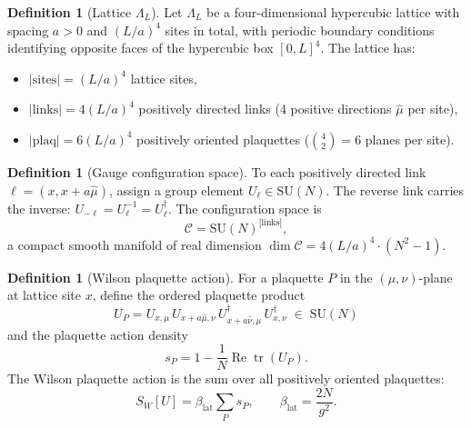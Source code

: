 \documentclass[12pt,a4paper]{article}
\theoremstyle{plain}
\theoremstyle{definition}
\newtheorem{definition}[theorem]{Definition}
\theoremstyle{remark}
\begin{document}
\begin{definition}[Lattice $\Lambda_L$]\label{def:lattice}
Let $\Lambda_L$ be a four-dimensional hypercubic lattice with spacing $a>0$ and $(L/a)^4$ sites in total, with periodic boundary conditions identifying opposite faces of the hypercubic box $[0,L]^4$. The lattice has:
\begin{itemize}[nosep]
\item $|\mathrm{sites}| = (L/a)^4$ lattice sites,
\item $|\mathrm{links}| = 4(L/a)^4$ positively directed links (4 positive directions $\hat\mu$ per site),
\item $|\mathrm{plaq}| = 6(L/a)^4$ positively oriented plaquettes ($\binom{4}{2}=6$ planes per site).
\end{itemize}
\end{definition}

\begin{definition}[Gauge configuration space]\label{def:config}
To each positively directed link $\ell = (x, x+a\hat{\mu})$, assign a group element $U_\ell \in \mathrm{SU}(N)$. The reverse link carries the inverse: $U_{-\ell} = U_\ell^{-1} = U_\ell^\dagger$. The configuration space is
\begin{equation}\label{eq:config}
\mathcal{C} = \mathrm{SU}(N)^{|\mathrm{links}|},
\end{equation}
a compact smooth manifold of real dimension $\dim\mathcal{C} = 4(L/a)^4 \cdot (N^2-1)$.
\end{definition}

\begin{definition}[Wilson plaquette action]\label{def:wilson}
For a plaquette $P$ in the $(\mu,\nu)$-plane at lattice site $x$, define the ordered plaquette product
\begin{equation}\label{eq:UP}
U_P = U_{x,\mu}\, U_{x+a\hat\mu,\nu}\, U_{x+a\hat\nu,\mu}^\dagger\, U_{x,\nu}^\dagger \;\in\; \mathrm{SU}(N)
\end{equation}
and the plaquette action density
\begin{equation}\label{eq:sp}
s_P = 1 - \frac{1}{N}\operatorname{Re}\operatorname{tr}(U_P).
\end{equation}
The Wilson plaquette action is the sum over all positively oriented plaquettes:
\begin{equation}\label{eq:SW}
S_W[U] = \beta_{\mathrm{lat}}\sum_{P} s_P, \qquad \beta_{\mathrm{lat}} = \frac{2N}{g^2}.
\end{equation}
\end{definition}
\end{document}
